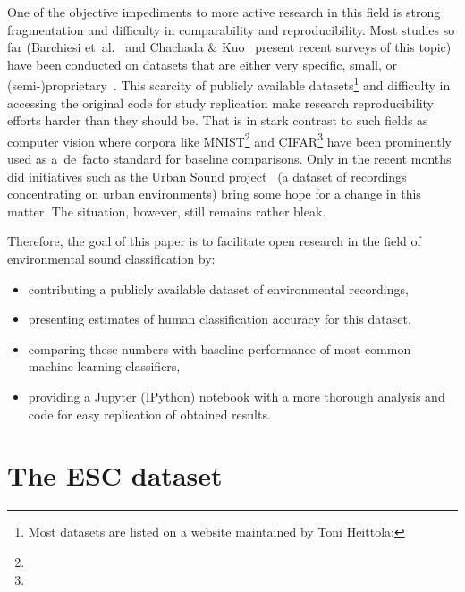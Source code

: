 \documentclass[letterpaper]{sig-alternate}
\begin{document}
One of the objective impediments to more active research in this field is strong fragmentation and difficulty in comparability and reproducibility. Most studies so far (Barchiesi et~al.~\cite{barchiesi2015acoustic} and Chachada \& Kuo~\cite{chachada2014environmental} present recent surveys of this topic) have been conducted on datasets that are either very specific, small, or (semi-)proprietary~\cite{giannoulis2013aasp, bbcsoundeffects, maxime2014sound, stowell2013open, lallemand2012content, nishiura2002evaluation, van2009dares, plinge2014bag}. This scarcity of publicly available datasets\footnote{Most datasets are listed on a website maintained by Toni Heittola:\newline{}} and difficulty in accessing the original code for study replication make research reproducibility efforts harder than they should be. That is in stark contrast to such fields as computer vision where corpora like MNIST\footnote{} and CIFAR\footnote{} have been prominently used as a~de~facto standard for baseline comparisons. Only in the recent months did initiatives such as the Urban Sound project~\cite{salamon2014dataset} (a dataset of recordings concentrating on urban environments) bring some hope for a change in this matter. The situation, however, still remains rather bleak.

Therefore, the goal of this paper is to facilitate open research in the field of environmental sound classification by:

\begin{itemize}[noitemsep,topsep=0pt]
\item contributing a publicly available dataset of environmental recordings,
\item presenting estimates of human classification accuracy for this dataset,
\item comparing these numbers with baseline performance of most common machine learning classifiers,
\item providing a Jupyter (IPython) notebook with a more thorough analysis and code for easy replication of obtained results.
\end{itemize}

\section{The ESC dataset}
\end{document}
